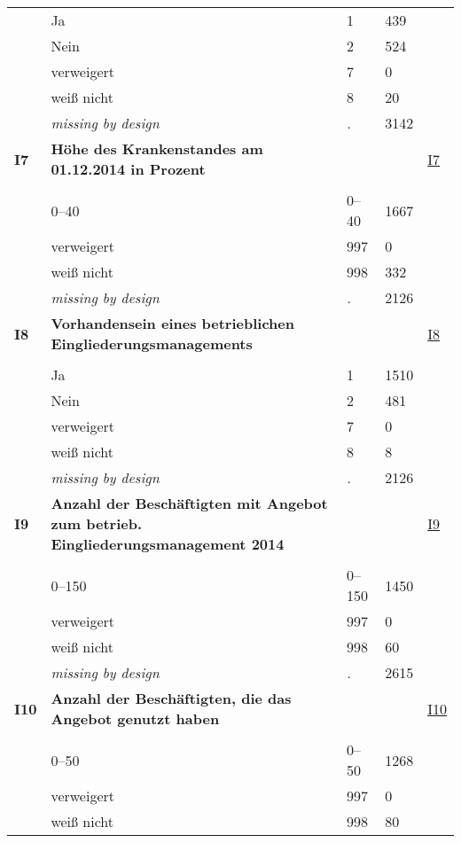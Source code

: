 \begin{longtable}{| L{2.65cm} | L{8cm} | C{1.5cm} | R{1.25cm} | C{2.25cm}  |}
   & Ja & 1 & 439 &  \\ 
   & Nein & 2 & 524 &  \\ 
   & verweigert & 7 & 0 &  \\ 
   & weiß nicht & 8 & 20 &  \\ 
   & \textit{missing by design} & \textit{.} & 3142 &  \\ 
   \midrule
\textbf{I7}\label{var:I7} & \textbf{Höhe des Krankenstandes am 01.12.2014 in Prozent} &  &  & \hyperref[I7]{I7} \\ 
   &  &  &  &  \\ 
   & 0--40 & 0--40 & 1667 &  \\ 
   & verweigert & 997 & 0 &  \\ 
   & weiß nicht & 998 & 332 &  \\ 
   & \textit{missing by design} & \textit{.} & 2126 &  \\ 
   \midrule
\textbf{I8}\label{var:I8} & \textbf{Vorhandensein eines betrieblichen Eingliederungsmanagements} &  &  & \hyperref[I8]{I8} \\ 
   &  &  &  &  \\ 
   & Ja & 1 & 1510 &  \\ 
   & Nein & 2 & 481 &  \\ 
   & verweigert & 7 & 0 &  \\ 
   & weiß nicht & 8 & 8 &  \\ 
   & \textit{missing by design} & \textit{.} & 2126 &  \\ 
   \midrule
\textbf{I9}\label{var:I9} & \textbf{Anzahl der Beschäftigten mit Angebot zum betrieb. Eingliederungsmanagement 2014} &  &  & \hyperref[I9]{I9} \\ 
   &  &  &  &  \\ 
   & 0--150 & 0--150 & 1450 &  \\ 
   & verweigert & 997 & 0 &  \\ 
   & weiß nicht & 998 & 60 &  \\ 
   & \textit{missing by design} & \textit{.} & 2615 &  \\ 
   \midrule
\textbf{I10}\label{var:I10} & \textbf{Anzahl der Beschäftigten, die das Angebot genutzt haben} &  &  & \hyperref[I10]{I10} \\ 
   &  &  &  &  \\ 
   & 0--50 & 0--50 & 1268 &  \\ 
   & verweigert & 997 & 0 &  \\ 
   & weiß nicht & 998 & 80 &  \\ 

\end{longtable}
